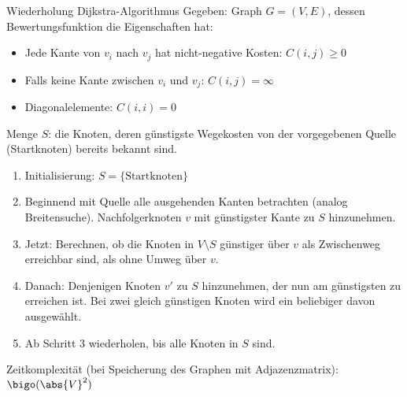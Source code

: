 \begin{algo}{Wiederholung Dijkstra-Algorithmus}
    Gegeben: Graph $G = (V, E)$, dessen Bewertungsfunktion die Eigenschaften hat:
    \begin{itemize}
        \item Jede Kante von $v_i$ nach $v_j$ hat nicht-negative Kosten: $C(i, j) \geq 0$
        \item Falls keine Kante zwischen $v_i$ und $v_j$: $C(i, j) = \infty$
        \item Diagonalelemente: $C(i, i) = 0$
    \end{itemize}

    Menge $S$: die Knoten, deren günstigste Wegekosten von der vorgegebenen Quelle (Startknoten) bereits bekannt sind.

    \begin{enumerate}
        \item Initialisierung: $S = \{ \text{Startknoten} \}$
        \item Beginnend mit Quelle alle ausgehenden Kanten betrachten (analog Breitensuche). Nachfolgerknoten $v$ mit günstigster Kante zu $S$ hinzunehmen.
        \item Jetzt: Berechnen, ob die Knoten in $V \setminus S$ günstiger über $v$ als Zwischenweg erreichbar sind, als ohne Umweg über $v$.
        \item Danach: Denjenigen Knoten $v'$ zu $S$ hinzunehmen, der nun am günstigsten zu erreichen ist. Bei zwei gleich günstigen Knoten wird ein beliebiger davon ausgewählt.
        \item Ab Schritt 3 wiederholen, bis alle Knoten in $S$ sind.
    \end{enumerate}

    Zeitkomplexität (bei Speicherung des Graphen mit Adjazenzmatrix): $\bigo(\abs{V}^2)$
\end{algo}

